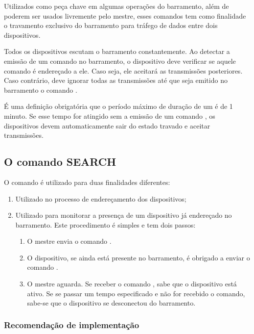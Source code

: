 Utilizados como peça chave em algumas operações do barramento, além de poderem ser usados livremente pelo mestre, esses comandos tem como finalidade o travamento exclusivo do barramento para tráfego de dados entre dois dispositivos.

Todos os dispositivos escutam o barramento constantemente. Ao detectar a emissão de um comando  no barramento, o dispositivo deve verificar se aquele comando é endereçado a ele. Caso seja, ele aceitará as transmissões posteriores. Caso contrário, deve ignorar todas as transmissões até que seja emitido no barramento o comando .

É uma definição obrigatória que o período máximo de duração de um  é de 1 minuto. Se esse tempo for atingido sem a emissão de um comando , os dispositivos devem automaticamente sair do estado travado e aceitar transmissões.

\subsection{O comando SEARCH}

O comando  é utilizado para duas finalidades diferentes:

\begin{enumerate}

\item Utilizado no processo de endereçamento dos dispositivos;
\item Utilizado para monitorar a presença de um dispositivo já endereçado no barramento. Este procedimento é simples e tem dois passos:
\begin{enumerate}
\item O mestre envia o comando .
\item O dispositivo, se ainda está presente no barramento, é obrigado a enviar o comando .
\item O mestre aguarda. Se receber o comando , sabe que o dispositivo está ativo. Se se passar um tempo especificado e não for recebido o comando, sabe-se que o dispositivo se desconectou do barramento.
\end{enumerate}

\end{enumerate}

\subsubsection{Recomendação de implementação}

